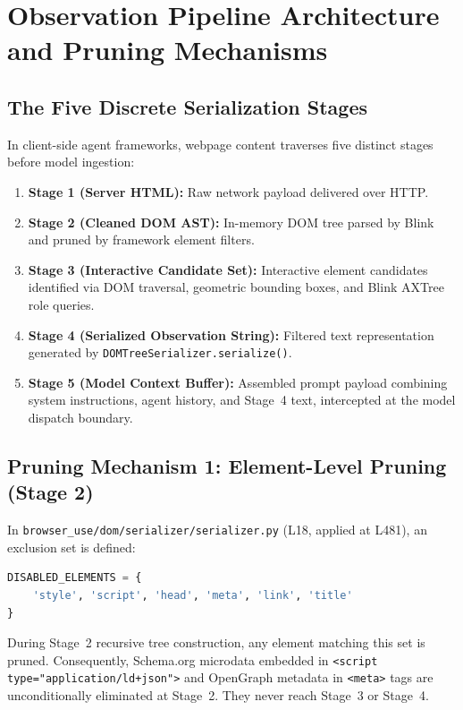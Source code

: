 \documentclass[conference]{IEEEtran}
\begin{document}
\section{Observation Pipeline Architecture and Pruning Mechanisms}
\label{sec:architecture}

\subsection{The Five Discrete Serialization Stages}
In client-side agent frameworks, webpage content traverses five distinct stages before model ingestion:
\begin{enumerate}
    \item \textbf{Stage 1 (Server HTML):} Raw network payload delivered over HTTP.
    \item \textbf{Stage 2 (Cleaned DOM AST):} In-memory DOM tree parsed by Blink and pruned by framework element filters.
    \item \textbf{Stage 3 (Interactive Candidate Set):} Interactive element candidates identified via DOM traversal, geometric bounding boxes, and Blink AXTree role queries.
    \item \textbf{Stage 4 (Serialized Observation String):} Filtered text representation generated by \texttt{DOMTreeSerializer.serialize()}.
    \item \textbf{Stage 5 (Model Context Buffer):} Assembled prompt payload combining system instructions, agent history, and Stage~4 text, intercepted at the model dispatch boundary.
\end{enumerate}

\subsection{Pruning Mechanism 1: Element-Level Pruning (Stage 2)}
In \texttt{browser\_use/dom/serializer/serializer.py} (L18, applied at L481), an exclusion set is defined:
\begin{lstlisting}[language=Python]
DISABLED_ELEMENTS = {
    'style', 'script', 'head', 'meta', 'link', 'title'
}
\end{lstlisting}
During Stage~2 recursive tree construction, any element matching this set is pruned. Consequently, Schema.org microdata embedded in \texttt{<script type="application/ld+json">} and OpenGraph metadata in \texttt{<meta>} tags are unconditionally eliminated at Stage~2. They never reach Stage~3 or Stage~4.
\end{document}
